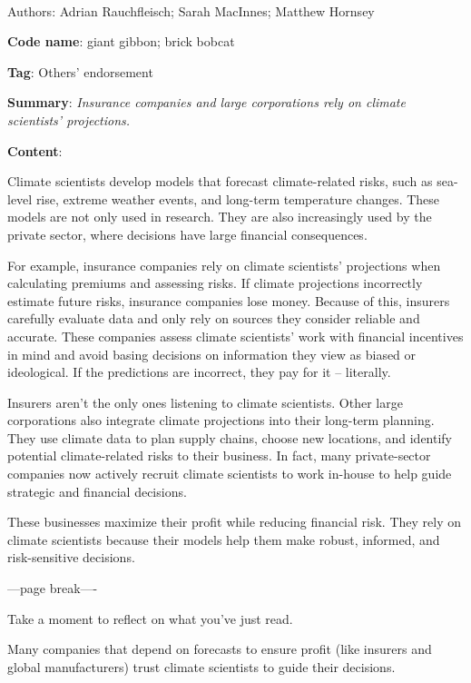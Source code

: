 \documentclass[
  letterpaper,
  DIV=11,
  numbers=noendperiod]{scrartcl}
\makeatletter
\let\oldparagraph\paragraph
\renewcommand{\paragraph}{
    \@ifstar
      \xxxParagraphStar
      \xxxParagraphNoStar
  }
\newcommand{\xxxParagraphStar}[1]{\oldparagraph*{#1}\mbox{}}
\newcommand{\xxxParagraphNoStar}[1]{\oldparagraph{#1}\mbox{}}
\makeatother
\begin{document}
\paragraph{Authors: Adrian Rauchfleisch; Sarah MacInnes; Matthew
Hornsey}\label{authors-adrian-rauchfleisch-sarah-macinnes-matthew-hornsey}

\textbf{Code name}: giant gibbon; brick bobcat

\textbf{Tag}: Others' endorsement

\textbf{Summary}: \emph{Insurance companies and large corporations rely
on climate scientists' projections.}

\textbf{Content}:

Climate scientists develop models that forecast climate-related risks,
such as sea-level rise, extreme weather events, and long-term
temperature changes. These models are not only used in research. They
are also increasingly used by the private sector, where decisions have
large financial consequences.

For example, insurance companies rely on climate scientists' projections
when calculating premiums and assessing risks. If climate projections
incorrectly estimate future risks, insurance companies lose money.
Because of this, insurers carefully evaluate data and only rely on
sources they consider reliable and accurate. These companies assess
climate scientists' work with financial incentives in mind and avoid
basing decisions on information they view as biased or ideological. If
the predictions are incorrect, they pay for it -- literally.

Insurers aren't the only ones listening to climate scientists. Other
large corporations also integrate climate projections into their
long-term planning. They use climate data to plan supply chains, choose
new locations, and identify potential climate-related risks to their
business. In fact, many private-sector companies now actively recruit
climate scientists to work in-house to help guide strategic and
financial decisions.

These businesses maximize their profit while reducing financial risk.
They rely on climate scientists because their models help them make
robust, informed, and risk-sensitive decisions.

---page break----

Take a moment to reflect on what you've just read.

Many companies that depend on forecasts to ensure profit (like insurers
and global manufacturers) trust climate scientists to guide their
decisions.
\end{document}
